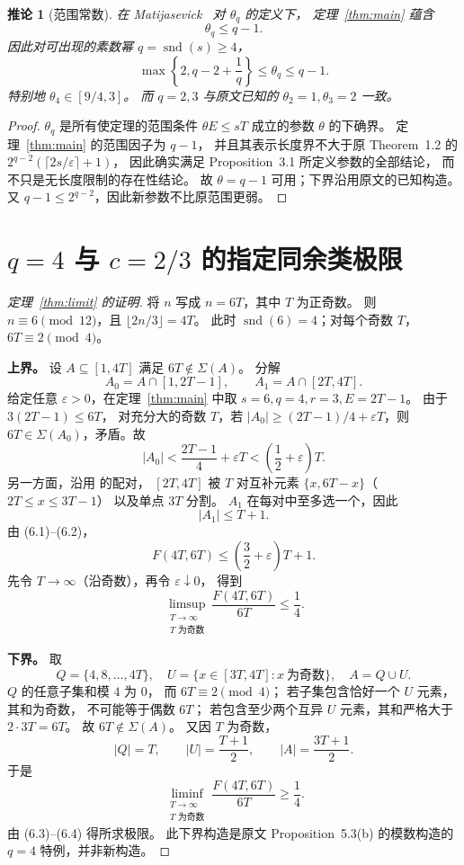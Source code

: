 \documentclass[UTF8,a4paper,11pt,fontset=none]{ctexart}
\newtheorem{corollary}[theorem]{推论}
\theoremstyle{remark}
\newcommand{\sig}{\Sigma}
\newcommand{\snd}{\operatorname{snd}}
\newcommand{\eps}{\varepsilon}
\begin{document}
\begin{corollary}[范围常数]\label{cor:theta}
在 Matijasevick~\cite{Matijasevick2026} 对 $\theta_q$ 的定义下，
定理~\ref{thm:main} 蕴含
\[
 \theta_q\le q-1.
\]
因此对可出现的素数幂 $q=\snd(s)\ge4$，
\[
 \boxed{\max\!\left\{2,q-2+\frac1q\right\}
        \le\theta_q\le q-1}.
\]
特别地 $\theta_4\in[9/4,3]$。
而 $q=2,3$ 与原文已知的 $\theta_2=1,\theta_3=2$ 一致。
\end{corollary}
\begin{proof}
$\theta_q$ 是所有使定理的范围条件
$\theta E\le sT$ 成立的参数 $\theta$ 的下确界。
定理~\ref{thm:main} 的范围因子为 $q-1$，
并且其表示长度界不大于原 Theorem~1.2 的
$2^{q-2}(\lceil2s/\eps\rceil+1)$，
因此确实满足 Proposition~3.1 所定义参数的全部结论，
而不只是无长度限制的存在性结论。
故 $\theta=q-1$ 可用；下界沿用原文的已知构造。
又 $q-1\le2^{q-2}$，因此新参数不比原范围更弱。
\end{proof}

\section{\texorpdfstring{$q=4$ 与 $c=2/3$}{q=4 与 c=2/3} 的指定同余类极限}
\begin{proof}[定理~\ref{thm:limit} 的证明]
将 $n$ 写成 $n=6T$，其中 $T$ 为正奇数。
则 $n\equiv6\pmod{12}$，且
$\lfloor2n/3\rfloor=4T$。
此时 $\snd(6)=4$；对每个奇数 $T$，
$6T\equiv2\pmod4$。

\textbf{上界。} 设 $A\subseteq[1,4T]$
满足 $6T\notin\sig(A)$。
分解
\[
 A_0=A\cap[1,2T-1],\qquad
 A_1=A\cap[2T,4T].
\]
给定任意 $\eps>0$，在定理~\ref{thm:main} 中取
$s=6,q=4,r=3,E=2T-1$。
由于 $3(2T-1)\le6T$，
对充分大的奇数 $T$，若
$|A_0|\ge(2T-1)/4+\eps T$，则
$6T\in\sig(A_0)$，矛盾。故
\[
 |A_0|<\frac{2T-1}{4}+\eps T
        <\left(\frac12+\eps\right)T. \tag{6.1}
\]
另一方面，沿用 \cite[Lemma~5.1]{Matijasevick2026} 的配对，
$[2T,4T]$ 被 $T$ 对互补元素
$\{x,6T-x\}$（$2T\le x\le3T-1$）
以及单点 $3T$ 分割。
$A_1$ 在每对中至多选一个，因此
\[
 |A_1|\le T+1. \tag{6.2}
\]
由 (6.1)--(6.2)，
\[
 F(4T,6T)\le\left(\frac32+\eps\right)T+1.
\]
先令 $T\to\infty$（沿奇数），再令 $\eps\downarrow0$，
得到
\[
 \limsup_{\substack{T\to\infty\\T\text{ 为奇数}}}
 \frac{F(4T,6T)}{6T}\le\frac14. \tag{6.3}
\]

\textbf{下界。} 取
\[
 Q=\{4,8,\ldots,4T\},\quad
 U=\{x\in[3T,4T]:x\ \text{为奇数}\},\quad
 A=Q\cup U.
\]
$Q$ 的任意子集和模 $4$ 为 $0$，
而 $6T\equiv2\pmod4$；
若子集包含恰好一个 $U$ 元素，其和为奇数，
不可能等于偶数 $6T$；
若包含至少两个互异 $U$ 元素，其和严格大于
$2\cdot3T=6T$。
故 $6T\notin\sig(A)$。
又因 $T$ 为奇数，
\[
 |Q|=T,\qquad |U|=\frac{T+1}{2},
 \qquad |A|=\frac{3T+1}{2}.
\]
于是
\[
 \liminf_{\substack{T\to\infty\\T\text{ 为奇数}}}
 \frac{F(4T,6T)}{6T}\ge\frac14. \tag{6.4}
\]
由 (6.3)--(6.4) 得所求极限。
此下界构造是原文 Proposition~5.3(b)
的模数构造的 $q=4$ 特例，并非新构造。
\end{proof}
\end{document}

